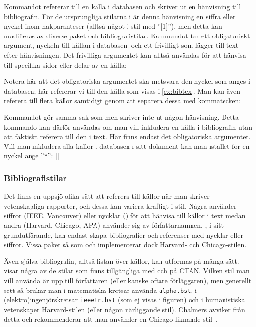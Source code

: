 \documentclass[lang=sv,ptsize=10pt,font=none,nomath,titles=bf,../../a4.tex]{subfiles}
\begin{document}
Kommandot  refererar till en källa i databasen och skriver ut
en hänvisning till bibliografin. För de ursprungliga stilarna i \BibTeX{}
är denna hänvisning en siffra eller nyckel inom hakparanteser (alltså
något i stil med ”[1]”), men detta kan modifieras av diverse paket och
bibliografistilar. Kommandot tar ett obligatoriskt argument, nyckeln till
källan i databasen, och ett frivilligt som lägger till text efter
hänvisningen. Det frivilliga argumentet kan alltså användas för att 
hänvisa till specifika sidor eller delar av en källa:
\begin{latexcode}
\cite{Hassanpour08}       %
\cite[s.~5]{Hassanpour08} %
\end{latexcode}

Notera här att det obligatoriska argumentet ska motsvara den nyckel som
anges i databasen; här refererar vi till den källa som visas i
\cref{ex:bibtex}.
Man kan även referera till flera källor samtidigt genom att separera
dessa med kommatecken:
\latex|\cite{Hassanpour08,Khan10} %

Kommandot  gör samma sak som  men skriver inte ut
någon hänvisning. Detta kommando kan därför användas om man vill
inkludera en källa i bibliografin utan att faktiskt referera till den i
text. Här finns endast det obligatoriska argumentet. Vill man inkludera
alla källor i databasen i sitt dokument kan man istället för en nyckel
ange ”\texttt{*}”:
\latex|\nocite{*}|

\subsubsection{Bibliografistilar}\label{sec:5:stilar}
Det finns en uppsjö olika sätt att referera till källor när man skriver
vetenskapliga rapporter, och dessa kan variera kraftigt i stil. Några
använder siffror (IEEE, Vancouver) eller nycklar (\AmS) för att hänvisa 
till källor i text medan andra (Harvard, Chicago, APA) använder sig av
författarnamnen.
\BibTeX, i sitt grundutförande, kan endast skapa bibliografier och
referenser med nycklar eller siffror. Vissa paket så som 
och  implementerar dock Harvard- och Chicago-stilen.

Även själva bibliografin, alltså listan över källor, kan utformas på
många sätt.  visar några av de stilar
som finns tillgängliga med \BibTeX{} och på CTAN. Vilken stil man vill
använda är upp till författaren (eller kanske oftare förläggaren), men
generellt sett så brukar man i matematiska kretsar använda 
\texttt{alpha.bst}, i (elektro)ingenjörskretsar \texttt{ieeetr.bst} (som
ej visas i figuren) och i humanistiska vetenskaper Harvard-stilen (eller
någon närliggande stil). Chalmers avviker från detta och rekommenderar att
man använder en Chicago-liknande stil~\parencite{ChsLib10}.
\end{document}
